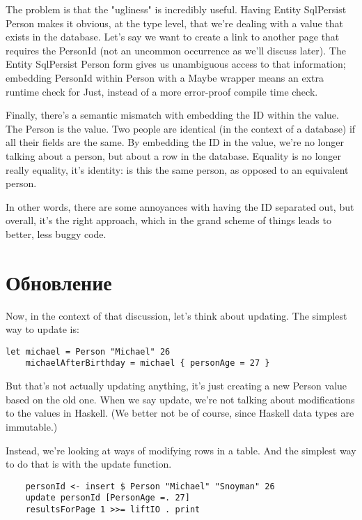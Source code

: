 The problem is that the "ugliness" is incredibly useful. Having Entity SqlPersist Person makes it obvious, at the type level, that we're dealing with a value that exists in the database. Let's say we want to create a link to another page that requires the PersonId (not an uncommon occurrence as we'll discuss later). The Entity SqlPersist Person form gives us unambiguous access to that information; embedding PersonId within Person with a Maybe wrapper means an extra runtime check for Just, instead of a more error-proof compile time check.

Finally, there's a semantic mismatch with embedding the ID within the value. The Person is the value. Two people are identical (in the context of a database) if all their fields are the same. By embedding the ID in the value, we're no longer talking about a person, but about a row in the database. Equality is no longer really equality, it's identity: is this the same person, as opposed to an equivalent person.

In other words, there are some annoyances with having the ID separated out, but overall, it's the right approach, which in the grand scheme of things leads to better, less buggy code.

\section{Обновление} %

Now, in the context of that discussion, let's think about updating. The simplest way to update is:

\begin{lstlisting}
let michael = Person "Michael" 26
    michaelAfterBirthday = michael { personAge = 27 }
\end{lstlisting}

But that's not actually updating anything, it's just creating a new Person value based on the old one. When we say update, we're not talking about modifications to the values in Haskell. (We better not be of course, since Haskell data types are immutable.)

Instead, we're looking at ways of modifying rows in a table. And the simplest way to do that is with the update function.

\begin{lstlisting}
    personId <- insert $ Person "Michael" "Snoyman" 26
    update personId [PersonAge =. 27]
    resultsForPage 1 >>= liftIO . print
\end{lstlisting}%

